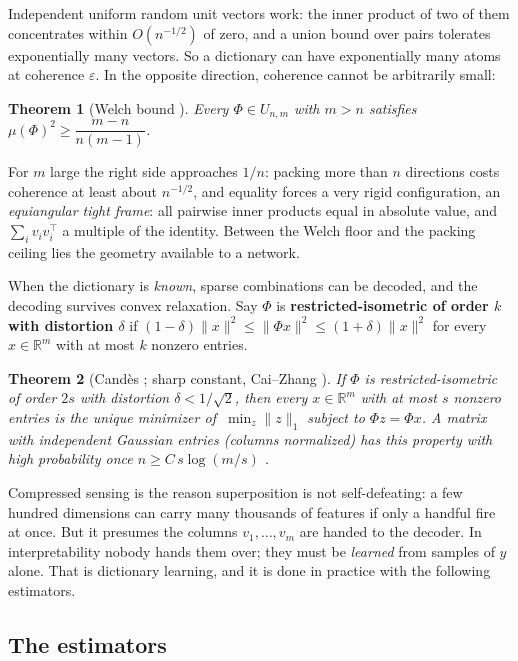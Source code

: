 \documentclass[11pt]{amsart}
\theoremstyle{plain}
\newtheorem{theorem}{Theorem}[section]
\theoremstyle{definition}
\newcommand{\R}{\mathbb{R}}
\begin{document}
Independent uniform random unit vectors work: the inner product of two of them concentrates within $O(n^{-1/2})$ of zero, and a union bound over pairs tolerates exponentially many vectors. So a dictionary can have exponentially many atoms at coherence $\varepsilon$. In the opposite direction, coherence cannot be arbitrarily small:

\begin{theorem}[Welch bound \cite{welch1974}]\label{thm:welch}
Every $\Phi\in U_{n,m}$ with $m>n$ satisfies
$\mu(\Phi)^2 \ge \dfrac{m-n}{n(m-1)}$.
\end{theorem}

For $m$ large the right side approaches $1/n$: packing more than $n$ directions costs coherence at least about $n^{-1/2}$, and equality forces a very rigid configuration, an \emph{equiangular tight frame}: all pairwise inner products equal in absolute value, and $\sum_i v_iv_i^{\!\top}$ a multiple of the identity. Between the Welch floor and the packing ceiling lies the geometry available to a network.

When the dictionary is \emph{known}, sparse combinations can be decoded, and the decoding survives convex relaxation. Say $\Phi$ is \textbf{restricted-isometric of order $k$ with distortion $\delta$} if $(1-\delta)\|x\|^2\le\|\Phi x\|^2\le(1+\delta)\|x\|^2$ for every $x\in\R^m$ with at most $k$ nonzero entries.

\begin{theorem}[Cand\`es \cite{candes2008}; sharp constant, Cai--Zhang \cite{caizhang2014}]\label{thm:cs}
If $\Phi$ is restricted-isometric of order $2s$ with distortion $\delta<1/\sqrt2$, then every $x\in\R^m$ with at most $s$ nonzero entries is the unique minimizer of $\ \min_z \|z\|_1$ subject to $\Phi z=\Phi x$. A matrix with independent Gaussian entries (columns normalized) has this property with high probability once $n\ge C\, s\log(m/s)$ \cite{baraniuk2008}.
\end{theorem}

Compressed sensing \cite{candes2006,donoho2006} is the reason superposition is not self-defeating: a few hundred dimensions can carry many thousands of features if only a handful fire at once. But it presumes the columns $v_1, \dots, v_m$ are handed to the decoder. In interpretability nobody hands them over; they must be \emph{learned} from samples of $y$ alone. That is dictionary learning, and it is done in practice with the following estimators.

\subsection{The estimators}\label{sec:estimators}
\end{document}
